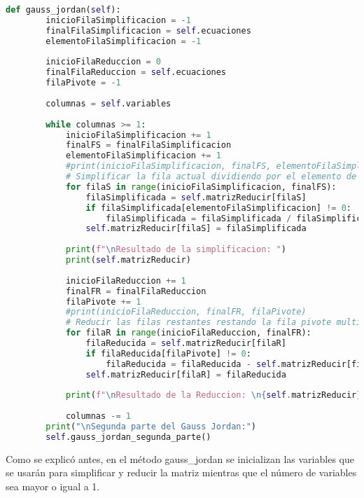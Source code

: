 \documentclass[letterpaper,12pt]{article}
\begin{document}
\begin{lstlisting}[style=jupyter, language=Python, caption={Método para resolver el sistema de ecuaciones}]
    def gauss_jordan(self):
        inicioFilaSimplificacion = -1
        finalFilaSimplificacion = self.ecuaciones
        elementoFilaSimplificacion = -1
        
        inicioFilaReduccion = 0
        finalFilaReduccion = self.ecuaciones
        filaPivote = -1
        
        columnas = self.variables
        
        while columnas >= 1:
            inicioFilaSimplificacion += 1
            finalFS = finalFilaSimplificacion
            elementoFilaSimplificacion += 1
            #print(inicioFilaSimplificacion, finalFS, elementoFilaSimplificacion)
            # Simplificar la fila actual dividiendo por el elemento de la columna correspondiente
            for filaS in range(inicioFilaSimplificacion, finalFS):
                filaSimplificada = self.matrizReducir[filaS]
                if filaSimplificada[elementoFilaSimplificacion] != 0:
                    filaSimplificada = filaSimplificada / filaSimplificada[elementoFilaSimplificacion]
                self.matrizReducir[filaS] = filaSimplificada
        
            print(f"\nResultado de la simplificacion: ")
            print(self.matrizReducir)
        
            inicioFilaReduccion += 1
            finalFR = finalFilaReduccion
            filaPivote += 1
            #print(inicioFilaReduccion, finalFR, filaPivote)
            # Reducir las filas restantes restando la fila pivote multiplicada por el elemento correspondiente
            for filaR in range(inicioFilaReduccion, finalFR):
                filaReducida = self.matrizReducir[filaR]
                if filaReducida[filaPivote] != 0:
                    filaReducida = filaReducida - self.matrizReducir[filaPivote]
                self.matrizReducir[filaR] = filaReducida
        
            print(f"\nResultado de la Reduccion: \n{self.matrizReducir}")
        
            columnas -= 1
        print("\nSegunda parte del Gauss Jordan:")
        self.gauss_jordan_segunda_parte()

\end{lstlisting}
Como se explicó antes, en el método \textcolor{jl_keyword}{gauss\_jordan} se inicializan las variables que se usarán para simplificar y reducir la matriz mientras que el número de variables sea mayor o igual a 1.
\end{document}
